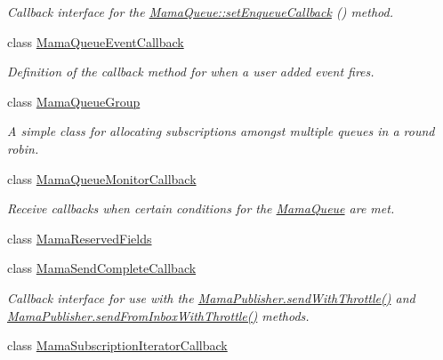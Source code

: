 \begin{DoxyCompactItemize}
\begin{DoxyCompactList}\small\item\em Callback interface for the \hyperlink{classWombat_1_1MamaQueue_a852c925667c07e8bd0b3bc8cf30f4986}{MamaQueue::setEnqueueCallback} () method. \item\end{DoxyCompactList}\item 
class \hyperlink{classWombat_1_1MamaQueueEventCallback}{MamaQueueEventCallback}
\begin{DoxyCompactList}\small\item\em Definition of the callback method for when a user added event fires. \item\end{DoxyCompactList}\item 
class \hyperlink{classWombat_1_1MamaQueueGroup}{MamaQueueGroup}
\begin{DoxyCompactList}\small\item\em A simple class for allocating subscriptions amongst multiple queues in a round robin. \item\end{DoxyCompactList}\item 
class \hyperlink{classWombat_1_1MamaQueueMonitorCallback}{MamaQueueMonitorCallback}
\begin{DoxyCompactList}\small\item\em Receive callbacks when certain conditions for the \hyperlink{classWombat_1_1MamaQueue}{MamaQueue} are met. \item\end{DoxyCompactList}\item 
class \hyperlink{classWombat_1_1MamaReservedFields}{MamaReservedFields}
\item 
class \hyperlink{classWombat_1_1MamaSendCompleteCallback}{MamaSendCompleteCallback}
\begin{DoxyCompactList}\small\item\em Callback interface for use with the \hyperlink{classWombat_1_1MamaPublisher_a77970e88c69a850c451d36fcb5c720cd}{MamaPublisher.sendWithThrottle()} and \hyperlink{classWombat_1_1MamaPublisher_aa9804ff85813df84e94bdea6215ae352}{MamaPublisher.sendFromInboxWithThrottle()} methods. \item\end{DoxyCompactList}\item 
class \hyperlink{classWombat_1_1MamaSubscriptionIteratorCallback}{MamaSubscriptionIteratorCallback}
\item 

\end{DoxyCompactItemize}
